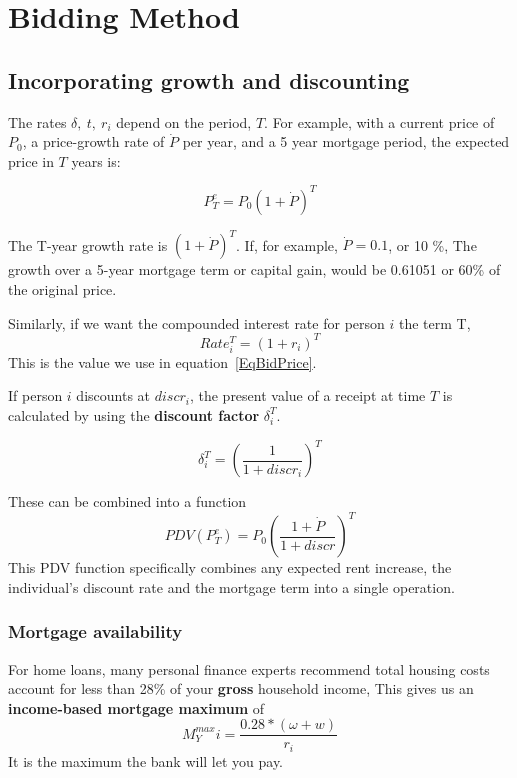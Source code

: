 \chapter[Bidding]{Bidding Method}
\label{AppendixA}

\section{Incorporating growth and discounting}
The rates $\delta,\ t,\ r_i$ depend on the period, $T$. For example, with a current price of $P_0$, a price-growth rate of $\dot P$ per year, and a 5 year mortgage period, the expected price in $T$ years is:


\[P^e_T=P_0(1+\dot P)^T\]

The T-year growth rate is $(1+\dot P)^T$. If, for example, $\dot P= 0.1$, or 10 \%, The growth  over a 5-year mortgage term or capital gain, would be 0.61051 or 60\% of the original price.

Similarly, if we want the compounded interest rate for person $i$ the term T,
\[Rate_i^T=(1+r_i)^T\]
This is the value we use in equation~\ref{EqBidPrice}.


If person $i$  discounts at $discr_i$, the present value of  a receipt at time $T$ is calculated by using the \textbf{discount factor} $\delta_i^T$.

\[\delta_i^T= \left( \frac{1}{1+discr_i} \right)^T \]
 
These can be combined into a function %
\[ PDV(P^e_T)=P_0\left( \frac{1+\dot P}{1+discr} \right)^T \]
This PDV function specifically combines any expected rent increase, the individual's discount rate and the mortgage term into a single operation. 




\subsection{Mortgage availability}

For home loans, many personal finance experts recommend total housing costs account for less than 28\% of your \textbf{gross} household income, This gives us an \textbf{income-based  mortgage maximum} of \[M^{max}_Yi = \frac{0.28*(\omega+w)}{r_i}\] It is the maximum the bank will let you pay.

